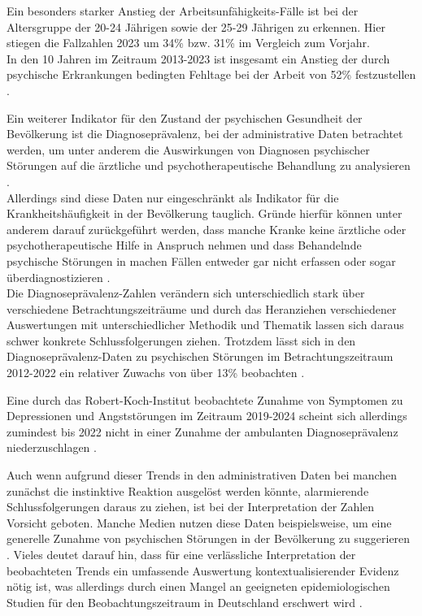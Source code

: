 Ein besonders starker Anstieg der Arbeitsunfähigkeits-Fälle ist bei der Altersgruppe der 20-24 Jährigen 
sowie der 25-29 Jährigen zu erkennen. Hier stiegen die Fallzahlen 2023 
um 34\% bzw. 31\% im Vergleich zum Vorjahr. \\
In den 10 Jahren im Zeitraum 2013-2023 ist insgesamt ein Anstieg 
der durch psychische Erkrankungen bedingten Fehltage bei der Arbeit von 52\% festzustellen 
\cite[]{latex:dak}. %

Ein weiterer Indikator für den Zustand der psychischen Gesundheit der Bevölkerung ist die Diagnoseprävalenz, 
bei der administrative Daten betrachtet werden, 
um unter anderem die Auswirkungen von Diagnosen psychischer Störungen auf die ärztliche und psychotherapeutische Behandlung zu analysieren \cite[]{thom2024trends}. \\ %

Allerdings sind diese Daten nur eingeschränkt als Indikator für die Krankheitshäufigkeit in der Bevölkerung tauglich. 
Gründe hierfür können unter anderem darauf zurückgeführt werden, 
dass manche Kranke keine ärztliche oder psychotherapeutische Hilfe in Anspruch nehmen 
und dass Behandelnde psychische Störungen in machen Fällen entweder gar nicht erfassen 
oder sogar überdiagnostizieren \cite[]{thom2024trends}. \\ %
Die Diagnoseprävalenz-Zahlen verändern sich unterschiedlich stark über verschiedene Betrachtungszeiträume und durch das Heranziehen verschiedener Auswertungen mit unterschiedlicher Methodik und Thematik lassen sich daraus schwer konkrete Schlussfolgerungen ziehen. Trotzdem lässt sich in den Diagnoseprävalenz-Daten zu psychischen Störungen im Betrachtungszeitraum 2012-2022 ein relativer Zuwachs von über 13\% beobachten \cite[]{thom2024trends}. %

Eine durch das Robert-Koch-Institut beobachtete Zunahme von Symptomen zu Depressionen und Angststörungen im Zeitraum 2019-2024 \cite[]{latex:rki} %
scheint sich allerdings zumindest bis 2022 nicht in einer Zunahme der ambulanten Diagnoseprävalenz niederzuschlagen \cite[]{thom2024trends}. %


Auch wenn aufgrund dieser Trends in den administrativen Daten bei manchen zunächst die instinktive Reaktion ausgelöst werden könnte, alarmierende Schlussfolgerungen daraus zu ziehen, ist bei der Interpretation der Zahlen Vorsicht geboten.
Manche Medien nutzen diese Daten beispielsweise, um eine generelle Zunahme von psychischen Störungen in der Bevölkerung zu suggerieren \cite[]{latex:nickels,latex:knollenborg}. %
Vieles deutet darauf hin, dass für eine verlässliche Interpretation der beobachteten Trends ein umfassende Auswertung kontextualisierender Evidenz nötig ist, was allerdings durch einen Mangel an geeigneten epidemiologischen Studien für den Beobachtungszeitraum in Deutschland erschwert wird 
\cite[]{thom2024trends}. %


